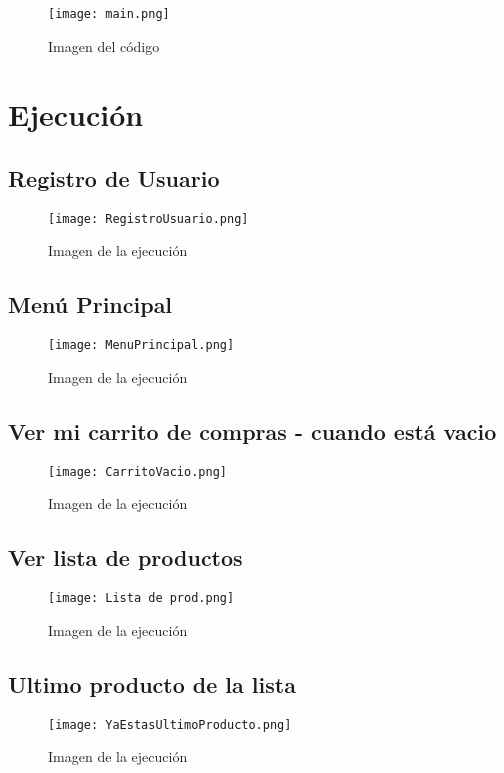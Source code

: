 \documentclass{article}
\begin{document}
\begin{figure}[!ht]
\centering
\texttt{[image: main.png]}
\caption{Imagen del código}
\end{figure}
\pagebreak

\pagebreak
\section{Ejecución}
\pagebreak
\subsection{Registro de Usuario}
  
\begin{figure}[!ht]
\centering
\texttt{[image: RegistroUsuario.png]}
\caption{Imagen de la ejecución}
\end{figure}

\subsection{Menú Principal}
   
\begin{figure}[!ht]
\centering
\texttt{[image: MenuPrincipal.png]}
\caption{Imagen de la ejecución}
\end{figure}

\subsection{Ver mi carrito de compras - cuando está vacio}
  
\begin{figure}[!ht]
\centering
\texttt{[image: CarritoVacio.png]}
\caption{Imagen de la ejecución}
\end{figure}
\pagebreak
\subsection{Ver lista de productos}
  
\begin{figure}[!ht]
\centering
\texttt{[image: Lista de prod.png]}
\caption{Imagen de la ejecución}
\end{figure}

\subsection{Ultimo producto de la lista}
\begin{figure}[!ht]
\centering
\texttt{[image: YaEstasUltimoProducto.png]}
\caption{Imagen de la ejecución}
\end{figure}
\end{document}
